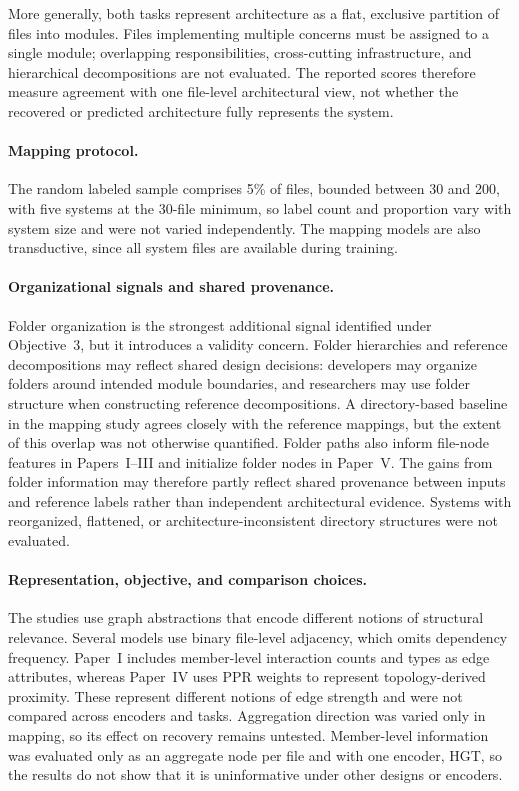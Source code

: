 More generally, both tasks represent architecture as a flat, exclusive partition of files into modules. Files implementing multiple concerns must be assigned to a single module; overlapping responsibilities, cross-cutting infrastructure, and hierarchical decompositions are not evaluated. The reported scores therefore measure agreement with one file-level architectural view, not whether the recovered or predicted architecture fully represents the system.

\paragraph{Mapping protocol.} The random labeled sample comprises 5\% of files, bounded between 30 and 200, with five systems at the 30-file minimum, so label count and proportion vary with system size and were not varied independently. The mapping models are also transductive, since all system files are available during training.

\paragraph{Organizational signals and shared provenance.} Folder organization is the strongest additional signal identified under Objective~3, but it introduces a validity concern. Folder hierarchies and reference decompositions may reflect shared design decisions: developers may organize folders around intended module boundaries, and researchers may use folder structure when constructing reference decompositions. A directory-based baseline in the mapping study agrees closely with the reference mappings, but the extent of this overlap was not otherwise quantified. Folder paths also inform file-node features in Papers~I--III and initialize folder nodes in Paper~V. The gains from folder information may therefore partly reflect shared provenance between inputs and reference labels rather than independent architectural evidence. Systems with reorganized, flattened, or architecture-inconsistent directory structures were not evaluated.

\paragraph{Representation, objective, and comparison choices.} The studies use graph abstractions that encode different notions of structural relevance. Several models use binary file-level adjacency, which omits dependency frequency. Paper~I includes member-level interaction counts and types as edge attributes, whereas Paper~IV uses PPR weights to represent topology-derived proximity. These represent different notions of edge strength and were not compared across encoders and tasks. Aggregation direction was varied only in mapping, so its effect on recovery remains untested. Member-level information was evaluated only as an aggregate node per file and with one encoder, HGT, so the results do not show that it is uninformative under other designs or encoders.

